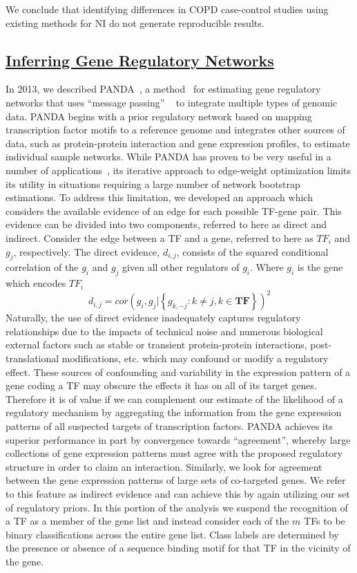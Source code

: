\documentclass[english]{article}
\begin{document}
We conclude that identifying differences in COPD case-control studies
using existing methods for NI do not generate reproducible results.


\subsection*{\uline{Inferring Gene Regulatory Networks}}

In 2013, we described PANDA~\cite{glass2013passing}, a method~\cite{olsen2014inference}
for estimating gene regulatory networks that uses “message passing” ~\cite{frey2007clustering}
to integrate multiple types of genomic data. PANDA begins with a prior
regulatory network based on mapping transcription factor motifs to
a reference genome and integrates other sources of data, such as protein-protein
interaction and gene expression profiles, to estimate individual sample
networks. While PANDA has proven to be very useful in a number of
applications~\cite{lao2015genome,glass2015network,glass2014sexually},
its iterative approach to edge-weight optimization limits its utility
in situations requiring a large number of network bootstrap estimations.
To address this limitation, we developed an approach which considers
the available evidence of an edge for each possible TF-gene pair.
This evidence can be divided into two components, referred to here
as direct and indirect. Consider the edge between a TF and a gene,
referred to here as $TF_{i}$ and $g_{j}$, respectively. The direct
evidence, $d_{i,j}$, consists of the squared conditional correlation
of the $g_{i}$ and $g_{j}$ given all other regulators of $g_{i}$.
Where $g_{i}$ is the gene which encodes $TF_{i}$ 
\[
d_{i,j}=cor\left(g_{i},g_{j}|\left\{ g_{k,-j}:k\ne j,k\in\mathbf{TF}\right\} \right)^{2}
\]
 Naturally, the use of direct evidence inadequately captures regulatory
relationships due to the impacts of technical noise and numerous biological
external factors such as stable or transient protein-protein interactions,
post-translational modifications, etc. which may confound or modify
a regulatory effect. These sources of confounding and variability
in the expression pattern of a gene coding a TF may obscure the effects
it has on all of its target genes. Therefore it is of value if we
can complement our estimate of the likelihood of a regulatory mechanism
by aggregating the information from the gene expression patterns of
all suspected targets of transcription factors. PANDA achieves its
superior performance in part by convergence towards “agreement”, whereby
large collections of gene expression patterns must agree with the
proposed regulatory structure in order to claim an interaction. Similarly,
we look for agreement between the gene expression patterns of large
sets of co-targeted genes. We refer to this feature as indirect evidence
and can achieve this by again utilizing our set of regulatory priors.
In this portion of the analysis we suspend the recognition of a TF
as a member of the gene list and instead consider each of the $m$
TFs to be binary classifications across the entire gene list. Class
labels are determined by the presence or absence of a sequence binding
motif for that TF in the vicinity of the gene.
\end{document}
